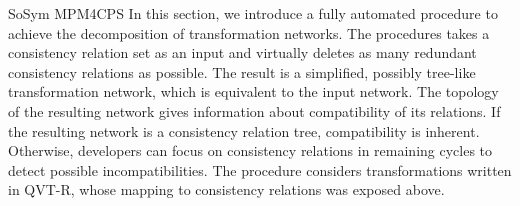 \begin{copiedFrom}{SoSym MPM4CPS}
In this section, we introduce a fully automated procedure to achieve the decomposition of transformation networks. The procedures takes a consistency relation set as an input and virtually deletes as many redundant consistency relations as possible. The result is a simplified, possibly tree-like transformation network, which 
is equivalent to %
the input network. 
The topology of the resulting network gives information about compatibility of its relations. If the resulting network is a consistency relation tree, compatibility is inherent. Otherwise, developers can focus on consistency relations in remaining cycles to detect possible incompatibilities.
The procedure considers transformations written in QVT-R, whose mapping to consistency relations was exposed above.


\end{copiedFrom}
